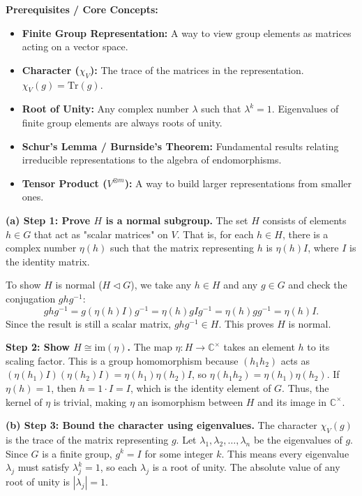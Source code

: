 \begin{solution}
\textbf{Prerequisites / Core Concepts:}
\begin{itemize}
    \item \textbf{Finite Group Representation:} A way to view group elements as matrices acting on a vector space.
    \item \textbf{Character ($\chi_V$):} The trace of the matrices in the representation. $\chi_V(g) = \text{Tr}(g)$.
    \item \textbf{Root of Unity:} Any complex number $\lambda$ such that $\lambda^k = 1$. Eigenvalues of finite group elements are always roots of unity.
    \item \textbf{Schur's Lemma / Burnside's Theorem:} Fundamental results relating irreducible representations to the algebra of endomorphisms.
    \item \textbf{Tensor Product ($V^{\otimes m}$):} A way to build larger representations from smaller ones.
\end{itemize}

\textbf{(a) Step 1: Prove $H$ is a normal subgroup.}
The set $H$ consists of elements $h \in G$ that act as "scalar matrices" on $V$. That is, for each $h \in H$, there is a complex number $\eta(h)$ such that the matrix representing $h$ is $\eta(h) I$, where $I$ is the identity matrix.

To show $H$ is normal ($H \triangleleft G$), we take any $h \in H$ and any $g \in G$ and check the conjugation $ghg^{-1}$:
\[ g h g^{-1} = g (\eta(h) I) g^{-1} = \eta(h) g I g^{-1} = \eta(h) g g^{-1} = \eta(h) I. \]
Since the result is still a scalar matrix, $ghg^{-1} \in H$. This proves $H$ is normal.

\textbf{Step 2: Show $H \cong \text{im}(\eta)$.}
The map $\eta: H \to \mathbb{C}^\times$ takes an element $h$ to its scaling factor. This is a group homomorphism because $(h_1 h_2)$ acts as $(\eta(h_1)I)(\eta(h_2)I) = \eta(h_1)\eta(h_2)I$, so $\eta(h_1 h_2) = \eta(h_1)\eta(h_2)$.
If $\eta(h) = 1$, then $h = 1 \cdot I = I$, which is the identity element of $G$. Thus, the kernel of $\eta$ is trivial, making $\eta$ an isomorphism between $H$ and its image in $\mathbb{C}^\times$.

\textbf{(b) Step 3: Bound the character using eigenvalues.}
The character $\chi_V(g)$ is the trace of the matrix representing $g$. Let $\lambda_1, \lambda_2, \dots, \lambda_n$ be the eigenvalues of $g$.
Since $G$ is a finite group, $g^k = I$ for some integer $k$. This means every eigenvalue $\lambda_j$ must satisfy $\lambda_j^k = 1$, so each $\lambda_j$ is a root of unity. 
The absolute value of any root of unity is $| \lambda_j | = 1$.


\end{solution}

